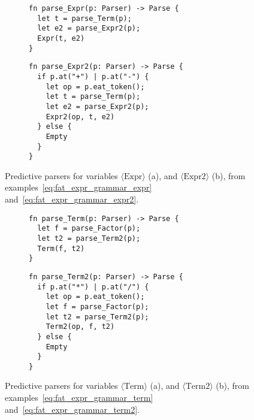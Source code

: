 \documentclass[
  oneside,
  english,
  coorientadorbanca,
  embeddedlogo,
  noabntexcite
]{ufsc-thesis-rn46-2019}
\newcommand{\bnfvars}[1]{\langle\textrm{#1}\rangle}
\begin{document}
\begin{figure}[ht]
  \centering
  \begin{subfigure}[b]{0.48\textwidth}
    \begin{minipage}{\textwidth}
      \begin{verbatim}
fn parse_Expr(p: Parser) -> Parse {
  let t = parse_Term(p);
  let e2 = parse_Expr2(p);
  Expr(t, e2)
}
      \end{verbatim}
    \end{minipage}
    \caption{}\label{fig:predictive_parser_expr}
  \end{subfigure}
  \quad
  \begin{subfigure}[b]{0.48\textwidth}
    \begin{minipage}{\textwidth}
      \begin{verbatim}
fn parse_Expr2(p: Parser) -> Parse {
  if p.at("+") | p.at("-") {
    let op = p.eat_token();
    let t = parse_Term(p);
    let e2 = parse_Expr2(p);
    Expr2(op, t, e2)
  } else {
    Empty
  }
}
      \end{verbatim}
    \end{minipage}
    \caption{}\label{fig:predictive_parser_expr2}
  \end{subfigure}
  \caption{
    Predictive parsers for variables $\bnfvars{Expr}$ (a), and $\bnfvars{Expr2}$ (b), from examples~\eqref{eq:fat_expr_grammar_expr} and~\eqref{eq:fat_expr_grammar_expr2}.
  }\label{fig:predictive_parser_expr_all}
\end{figure}

\begin{figure}[ht]
  \centering
  \begin{subfigure}[b]{0.48\textwidth}
    \begin{minipage}{\textwidth}
      \begin{verbatim}
fn parse_Term(p: Parser) -> Parse {
  let f = parse_Factor(p);
  let t2 = parse_Term2(p);
  Term(f, t2)
}
      \end{verbatim}
    \end{minipage}
    \caption{}\label{fig:predictive_parser_term}
  \end{subfigure}
  \quad
  \begin{subfigure}[b]{0.48\textwidth}
    \begin{minipage}{\textwidth}
      \begin{verbatim}
fn parse_Term2(p: Parser) -> Parse {
  if p.at("*") | p.at("/") {
    let op = p.eat_token();
    let f = parse_Factor(p);
    let t2 = parse_Term2(p);
    Term2(op, f, t2)
  } else {
    Empty
  }
}
      \end{verbatim}
    \end{minipage}
    \caption{}\label{fig:predictive_parser_term2}
  \end{subfigure}
  \caption{
    Predictive parsers for variables $\bnfvars{Term}$ (a), and $\bnfvars{Term2}$ (b), from examples~\eqref{eq:fat_expr_grammar_term} and~\eqref{eq:fat_expr_grammar_term2}.
  }\label{fig:predictive_parser_expr_term_all}
\end{figure}
\end{document}
